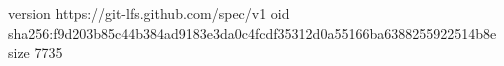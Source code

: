 version https://git-lfs.github.com/spec/v1
oid sha256:f9d203b85c44b384ad9183e3da0c4fcdf35312d0a55166ba6388255922514b8e
size 7735
